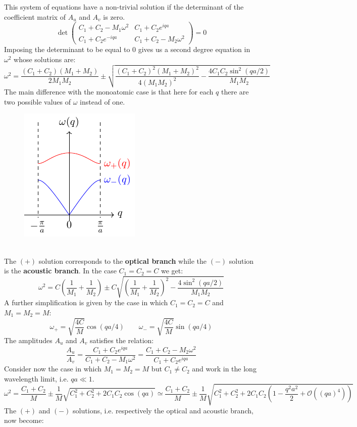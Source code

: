 \documentclass[10.75pt,a4paper,openright,bottom=2cm]{article}
\begin{document}
This system of equations have a non-trivial solution if the determinant of the coefficient matrix of $A_u$ and $A_v$ is zero.
\[
\det\left(\begin{array}{cc}
    C_1+C_2-M_1\omega^2 & C_1+C_2e^{iqa} \\
    C_1+C_2e^{-iqa} & C_1+C_2-M_2\omega^2
\end{array}\right)=0
\]
Imposing the determinant to be equal to 0 gives us a second degree equation in $\omega^2$ whose solutions are:
\[
\omega^2=\frac{(C_1+C_2)(M_1+M_2)}{2M_1M_2}\pm\sqrt{\frac{(C_1+C_2)^2(M_1+M_2)^2}{4(M_1M_2)^2}-\frac{4C_1C_2\sin^2(qa/2)}{M_1M_2}}
\]
The main difference with the monoatomic case is that here for each $q$ there are two possible values of $\omega$ instead of one.
\begin{figure}[h]
    \centering
    \includegraphics{omega+-.pdf}
    \label{fig:omega+-}
\end{figure}\\
\noindent
The $(+)$ solution corresponds to the \textbf{optical branch} while the $(-)$ solution is the \textbf{acoustic branch}. In the case $C_1=C_2=C$ we get:
\[
\omega^2=C\left(\frac{1}{M_1}+\frac{1}{M_2}\right)\pm C\sqrt{\left(\frac{1}{M_1}+\frac{1}{M_2}\right)^2-\frac{4\sin^2(qa/2)}{M_1M_2}}
\]
A further simplification is given by the case in which $C_1=C_2=C$ and $M_1=M_2=M$:
\[
\omega_+=\sqrt{\frac{4C}{M}}\cos(qa/4) \qquad \omega_-=\sqrt{\frac{4C}{M}}\sin(qa/4)
\]
The amplitudes $A_u$ and $A_v$ satisfies the relation:
\[
\frac{A_u}{A_v}=\frac{C_1+C_2e^{iqa}}{C_1+C_2-M_1\omega^2}=\frac{C_1+C_2-M_2\omega^2}{C_1+C_2e^{iqa}}
\]
Consider now the case in which $M_1=M_2=M$ but $C_1\neq C_2$ and work in the long wavelength limit, i.e. $qa\ll1$.
\[
\omega^2=\frac{C_1+C_2}{M}\pm\frac{1}{M}\sqrt{C_1^2+C_2^2+2C_1C_2\cos(qa)}\simeq\frac{C_1+C_2}{M}\pm\frac{1}{M}\sqrt{C_1^2+C_2^2+2C_1C_2\left(1-\frac{q^2a^2}{2}+\mathcal{O}((qa)^4)\right)}
\]
The $(+)$ and $(-)$ solutions, i.e. respectively the optical and acoustic branch, now become:
\end{document}
